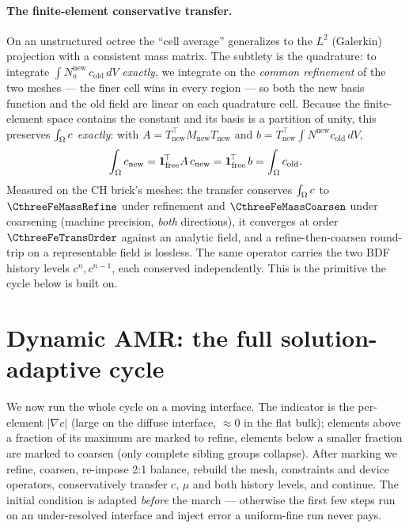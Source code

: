 \paragraph{The finite-element conservative transfer.}
On an unstructured octree the ``cell average'' generalizes to the $L^2$
(Galerkin) projection with a consistent mass matrix. The subtlety is the
quadrature: to integrate $\int N_a^{\text{new}}\,c_{\text{old}}\,dV$
\emph{exactly}, we integrate on the \emph{common refinement} of the two
meshes --- the finer cell wins in every region --- so both the new basis
function and the old field are linear on each quadrature cell. Because the
finite-element space contains the constant and its basis is a
partition of unity, this preserves $\int_\Omega c$ \emph{exactly}: with
$A=T^{\!\top}_{\text{new}} M_{\text{new}} T_{\text{new}}$ and
$b=T^{\!\top}_{\text{new}}\!\int N^{\text{new}} c_{\text{old}}\,dV$,
%
\begin{equation}
  \int_\Omega{c_{\text{new}}}
    = \mathbf{1}^{\!\top}_{\text{free}} A\,c_{\text{new}}
    = \mathbf{1}^{\!\top}_{\text{free}}\, b
    = \int_\Omega{c_{\text{old}}}.
\end{equation}
%
Measured on the CH brick's meshes: the transfer conserves $\int_\Omega c$ to
$\CthreeFeMassRefine$ under refinement and $\CthreeFeMassCoarsen$ under
coarsening (machine precision, \emph{both} directions), it converges at
order $\CthreeFeTransOrder$ against an analytic field, and a
refine-then-coarsen round-trip on a representable field is lossless. The
same operator carries the two BDF history levels $c^{n},c^{n-1}$, each
conserved independently. This is the primitive the cycle below is built on.

\section{Dynamic AMR: the full solution-adaptive cycle}

We now run the whole cycle on a moving interface. The indicator is the
per-element $|\nabla c|$ (large on the diffuse interface, $\approx0$ in the
flat bulk); elements above a fraction of its maximum are marked to refine,
elements below a smaller fraction are marked to coarsen (only complete
sibling groups collapse). After marking we refine, coarsen, re-impose 2:1
balance, rebuild the mesh, constraints and device operators, conservatively
transfer $c$, $\mu$ and both history levels, and continue. The initial
condition is adapted \emph{before} the march --- otherwise the first few
steps run on an under-resolved interface and inject error a uniform-fine
run never pays.

